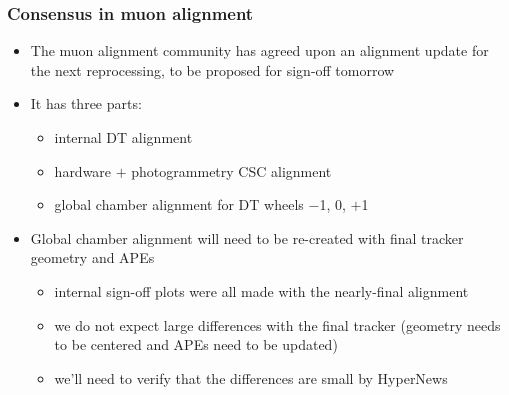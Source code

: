 \documentclass[compress]{beamer}
\begin{document}
\begin{frame}
\frametitle{Consensus in muon alignment}
\begin{itemize}\setlength{\itemsep}{0.5 cm}
\item The muon alignment community has agreed upon an alignment update for the next reprocessing, to be proposed for sign-off tomorrow
\item It has three parts:
\begin{itemize}\setlength{\itemsep}{0.15 cm}
\item internal DT alignment
\item hardware $+$ photogrammetry CSC alignment
\item global chamber alignment for DT wheels $-$1, 0, $+$1
\end{itemize}
\item Global chamber alignment will need to be re-created with final tracker geometry and APEs
\begin{itemize}\setlength{\itemsep}{0.1 cm}\scriptsize
\item internal sign-off plots were all made with the nearly-final alignment
\item we do not expect large differences with the final tracker (geometry needs to be centered and APEs need to be updated)
\item we'll need to verify that the differences are small by HyperNews
\end{itemize}
\end{itemize}
\end{frame}
\end{document}
